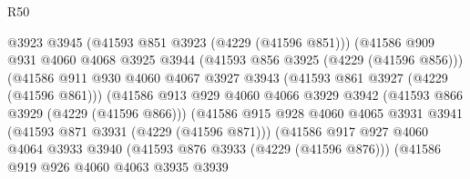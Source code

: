 \begin{lexlean}{R50}
\begin{coremodule}
                                    @3923
                                    @3945
                                    (@41593 @851 @3923 (@4229 (@41596 @851)))
                                    (@41586
                                      @909
                                      @931
                                      @4060
                                      @4068
                                      @3925
                                      @3944
                                      (@41593 @856 @3925 (@4229 (@41596 @856)))
                                      (@41586
                                        @911
                                        @930
                                        @4060
                                        @4067
                                        @3927
                                        @3943
                                        (@41593 @861 @3927 (@4229 (@41596 @861)))
                                        (@41586
                                          @913
                                          @929
                                          @4060
                                          @4066
                                          @3929
                                          @3942
                                          (@41593 @866 @3929 (@4229 (@41596 @866)))
                                          (@41586
                                            @915
                                            @928
                                            @4060
                                            @4065
                                            @3931
                                            @3941
                                            (@41593 @871 @3931 (@4229 (@41596 @871)))
                                            (@41586
                                              @917
                                              @927
                                              @4060
                                              @4064
                                              @3933
                                              @3940
                                              (@41593 @876 @3933 (@4229 (@41596 @876)))
                                              (@41586
                                                @919
                                                @926
                                                @4060
                                                @4063
                                                @3935
                                                @3939

\end{coremodule}
\end{lexlean}
